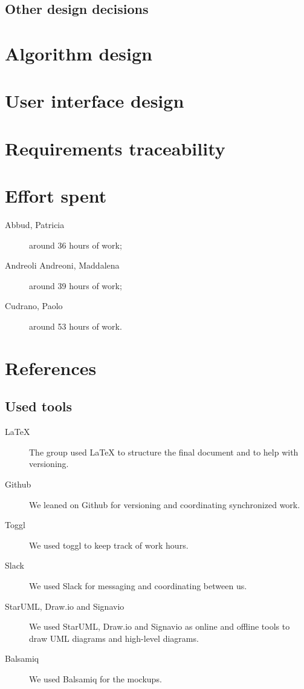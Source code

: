 \documentclass[12pt, a4paper]{article}
\begin{document}
			

		\subsection{Other design decisions}
			

	\newpage
	\section{Algorithm design}
	\label{sec:algorithm_design}
		

	\newpage
	\section{User interface design}
	\label{sec:user_interface_design}
		

	\newpage
	\section{Requirements traceability}
		

	\newpage
	\section{Effort spent}
		\begin{description}
			\item[Abbud, Patricia] around 36 hours of work;
			\item[Andreoli Andreoni, Maddalena] around 39 hours of work;
			\item[Cudrano, Paolo] around 53 hours of work.
		\end{description}

	\newpage
	\section{References}
		\subsection{Used tools}
		\begin{description}
			\item [LaTeX] The group used LaTeX to structure the final document and to help with versioning.
			\item [Github] We leaned on Github for versioning and coordinating synchronized work.
			\item [Toggl] We used toggl to keep track of work hours.
			\item [Slack] We used Slack for messaging and coordinating between us.
			\item [StarUML, Draw.io and Signavio] We used StarUML, Draw.io and Signavio as online and offline tools to draw UML diagrams and high-level diagrams.
			\item [Balsamiq] We used Balsamiq for the mockups.
		\end{description}
	
\end{document}
